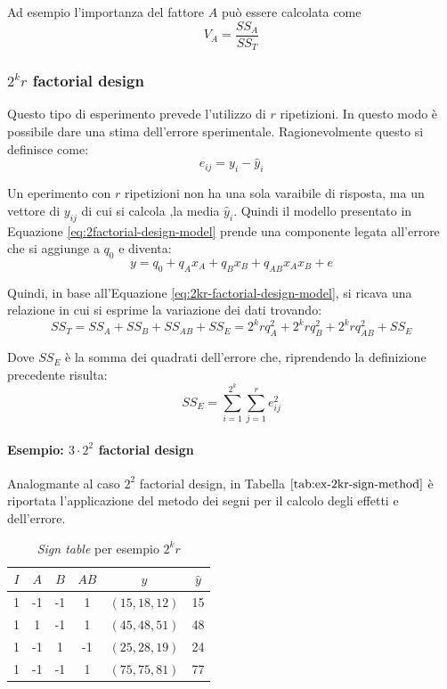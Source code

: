 \documentclass{article}
\begin{document}
Ad esempio l'importanza del fattore $A$ può essere calcolata come 
\[
  V_A = \frac{SS_A}{SS_T}
\]
\subsubsection{$2^{k}r$ factorial design}
Questo tipo di esperimento prevede l'utilizzo di $r$ ripetizioni. In questo modo è possibile
dare una stima dell'errore sperimentale. Ragionevolmente questo si definisce come:
\[
  e_{ij} = y_{i} - \hat{y}_i
\]

Un eperimento con $r$ ripetizioni non ha una sola varaibile di risposta, ma un vettore di 
$y_{ij}$ di cui si calcola ,la media $\hat{y}_i$. Quindi il modello presentato in Equazione
\ref{eq:2factorial-design-model} prende una componente legata all'errore che si aggiunge a 
$q_0$ e diventa:
\begin{equation}
  y = q_0 + q_A x_A + q_B x_B + q_{AB}x_Ax_B + e
  \label{eq:2kr-factorial-design-model}
\end{equation}

Quindi, in base all'Equazione \ref{eq:2kr-factorial-design-model}, si ricava una relazione
in cui si esprime la variazione dei dati trovando:
\begin{equation}
  SS_T = SS_A + SS_B + SS_{AB} + SS_E = 2^krq_A^2 + 2^krq_B^2 + 2^krq_{AB}^2 + SS_E
  \label{eq:2kr-variation}
\end{equation}

Dove $SS_E$ è la somma dei quadrati dell'errore che, riprendendo la definizione precedente 
risulta:
$$SS_E = \sum_{i=1}^{2^k}\sum_{j=1}^r e_{ij}^2$$

\paragraph{Esempio: $3\cdot2^2$ factorial design}
Analogmante al caso $2^2$ factorial design, in Tabella $\ref{tab:ex-2kr-sign-method}$ è 
riportata l'applicazione del metodo dei segni per il calcolo degli effetti e dell'errore.

\begin{table}[h]
  \begin{center}
    \begin{tabular}[c]{|c|c|c|c|c|c|}
      \hline
      \multicolumn{1}{|c|}{\textbf{$I$}} & 
      \multicolumn{1}{c|}{\textbf{$A$}} & 
      \multicolumn{1}{c|}{\textbf{$B$}} & 
      \multicolumn{1}{c|}{\textbf{$AB$}} & 
      \multicolumn{1}{c|}{\textbf{$y$}} & 
      \multicolumn{1}{c|}{\textbf{$\hat{y}$}} \\ 

      \hline
      1 & -1 & -1 & 1 & $(15,18,12)$ &15 \\
      1 & 1 & -1 & 1 & $(45,48,51)$ & 48 \\
      1 & -1 & 1 & -1 & $(25,28,19)$& 24 \\
      1 & -1 & -1 & 1 & $(75,75,81)$ & 77 \\
      \hline
    \end{tabular}
    \caption{\textit{Sign table} per esempio $2^kr$}
    \label{tab:ex-2kr-sign-method}
  \end{center}
\end{table}
\end{document}
